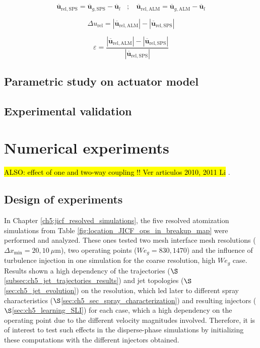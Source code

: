 \begin{equation}
\overline{\textbf{u}}_\mathrm{rel,SPS} = \overline{\textbf{u}}_{g,\mathrm{SPS}} - \overline{\textbf{u}}_l ~~~~ ; ~~~~  \overline{\textbf{u}}_\mathrm{rel,ALM} = \overline{\textbf{u}}_{g,\mathrm{ALM}} - \overline{\textbf{u}}_l
\end{equation}

\begin{equation}
\Delta u_\mathrm{rel} = | \overline{\textbf{u}}_\mathrm{rel,ALM}| - |\overline{\textbf{u}}_\mathrm{rel,SPS}|
\end{equation}

\begin{equation}
\varepsilon =  \frac{|\overline{\textbf{u}}_\mathrm{rel,ALM}| - |\overline{\textbf{u}}_\mathrm{rel,SPS}|}{|\overline{\textbf{u}}_\mathrm{rel,SPS}|} 
\end{equation}

\subsection{Parametric study on actuator model}

\subsection{Experimental validation}

\clearpage

\section{Numerical experiments}

\hl{ALSO: effect of one and two-way coupling !! Ver articulos 2010, 2011 Li }.

\subsection{Design of experiments}

In Chapter \ref{ch5:jicf_resolved_simulations}, the five resolved atomization simulations from Table \ref{fig:location_JICF_ops_in_breakup_map} were performed and analyzed. These ones tested two mesh interface mesh resolutions ($\Delta x_\mathrm{min} = 20, 10~\mu$m), two operating points ($We_g = 830, 1470$) and the influence of turbulence injection in one simulation for the coarse resolution, high $We_g$ case. Results shown a high dependency of the trajectories ($\S$\ref{subsec:ch5_jet_trajectories_results}) and jet topologies ($\S$\ref{sec:ch5_jet_evolution}) on the resolution, which led later to different spray characteristics ($\S$\ref{sec:ch5_sec_spray_characterization}) and resulting injectors ($\S$\ref{sec:ch5_learning_SLI}) for each case, which a high dependency on the operating point due to the different velocity magnitudes involved. Therefore, it is of interest to test such effects in the disperse-phase simulations by initializing these computations with the different injectors obtained.

